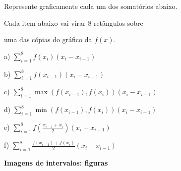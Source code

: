 \documentclass[oneside,12pt]{article}
\begin{document}
Represente graficamente cada um dos somatórios abaixo.

Cada item abaixo vai virar 8 retângulos sobre

uma das cópias do gráfico da $f(x)$.

\msk

\def\sumo{\sum_{i=1}^{8}}
\def\sumoo#1{\sumo #1 (x_i - x_{i-1})}

a) $\sumoo{f(x_i)}$

\ssk

b) $\sumoo{f(x_{i-1})}$

\ssk

c) $\sumoo{\max(f(x_{i-1}), f(x_i))}$

\ssk

d) $\sumoo{\min(f(x_{i-1}), f(x_i))}$

\ssk

e) $\sumoo{f(\frac{x_{i-1} + x_i}{2})}$

\ssk

f) $\sumoo{\frac{f(x_{i-1}) + f(x_i)}{2}}$


\newpage

%


{\bf Imagens de intervalos: figuras}

\bsk
\bsk

\pu
\end{document}
